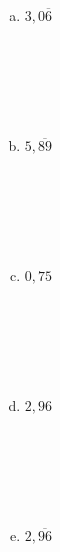\documentclass[a4paper,14pt]{article}
\begin{document}
\begin{multicols}{2}
\begin{enumerate}
\begin{enumerate}[a)]
				\item $3,0\overline{6}$ \\\\\\\\\\\\
				\item $5,\overline{89}$ \\\\\\\\\\\\
				\item $0,75$ \\\\\\\\\\\\
				\item $2,96$ \\\\\\\\\\\\
				\item $2,\overline{96}$ \\\\\\\\\\\\
			\end{enumerate}
		\end{enumerate}
		$~$ \\ $~$ \\ $~$ \\ $~$ \\ $~$ 
	\end{multicols}
\end{document}
